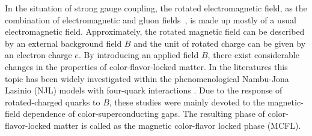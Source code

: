 \documentclass[12pt]{article}
\begin{document}
In the situation of strong gauge coupling, the rotated electromagnetic field, as the combination of
electromagnetic and gluon fields~\cite{alford1998qcd,alford2000magnetic}, is made up mostly of a usual
electromagnetic field. Approximately, the rotated magnetic field can be described by an external background field
$B$ and the unit of rotated charge can be given by an electron charge $e$.
By introducing an applied field $B$, there exist considerable changes in the properties of color-flavor-locked matter. 
In the literatures this topic has been widely investigated within the phenomenological Nambu-Jona Lasinio (NJL)
models with four-quark interactions \cite{ferrer2005magnetic,fukushima2008color,ferrer2006color,ferrer2007magnetic,sen2015anisotropic}. Due to the response of rotated-charged quarks to $B$, these studies were mainly devoted to the magnetic-field dependence of
color-superconducting gaps. The resulting phase of color-flavor-locked matter is called as the magnetic color-flavor locked phase
(MCFL). 
\end{document}
